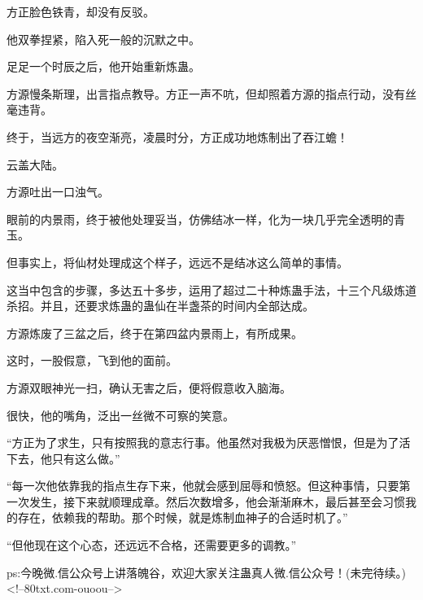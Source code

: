 \begin{this_body}
方正脸色铁青，却没有反驳。

他双拳捏紧，陷入死一般的沉默之中。

足足一个时辰之后，他开始重新炼蛊。

方源慢条斯理，出言指点教导。方正一声不吭，但却照着方源的指点行动，没有丝毫违背。

终于，当远方的夜空渐亮，凌晨时分，方正成功地炼制出了吞江蟾！

云盖大陆。

方源吐出一口浊气。

眼前的内景雨，终于被他处理妥当，仿佛结冰一样，化为一块几乎完全透明的青玉。

但事实上，将仙材处理成这个样子，远远不是结冰这么简单的事情。

这当中包含的步骤，多达五十多步，运用了超过二十种炼蛊手法，十三个凡级炼道杀招。并且，还要求炼蛊的蛊仙在半盏茶的时间内全部达成。

方源炼废了三盆之后，终于在第四盆内景雨上，有所成果。

这时，一股假意，飞到他的面前。

方源双眼神光一扫，确认无害之后，便将假意收入脑海。

很快，他的嘴角，泛出一丝微不可察的笑意。

“方正为了求生，只有按照我的意志行事。他虽然对我极为厌恶憎恨，但是为了活下去，他只有这么做。”

“每一次他依靠我的指点生存下来，他就会感到屈辱和愤怒。但这种事情，只要第一次发生，接下来就顺理成章。然后次数增多，他会渐渐麻木，最后甚至会习惯我的存在，依赖我的帮助。那个时候，就是炼制血神子的合适时机了。”

“但他现在这个心态，还远远不合格，还需要更多的调教。”

ps:今晚微.信公众号上讲落魄谷，欢迎大家关注蛊真人微.信公众号！(未完待续。)<!--80txt.com-ouoou-->

\end{this_body}


